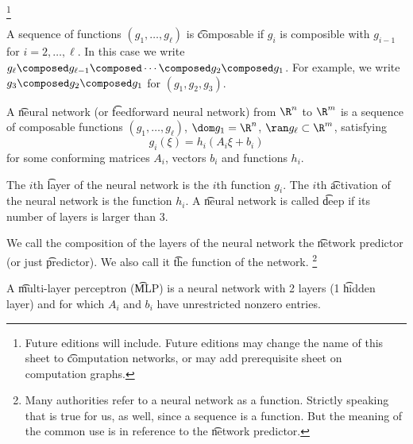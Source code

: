 
  \ifhmode\unskip\fi\footnote{
Future editions will include. Future editions may change the name of this sheet to \t{computation networks}, or may add prerequisite sheet on computation graphs.
  }


A sequence of functions $(g_1, \dots, g_\ell)$ is \t{composable} if $g_i$ is composible with $g_{i-1}$ for $i = 2, \dots, \ell$.
In this case we write $g_\ell \composed g_{\ell-1} \composed \cdots \composed g_2 \composed g_1$. For example, we write $g_3 \composed g_2 \composed g_1$ for $(g_1, g_2, g_3)$.

A \t{neural network} (or \t{feedforward neural network}) from $\R^n$ to $\R^m$ is a sequence of composable functions $(g_1, \dots, g_{\ell})$, $\dom g_1 = \R^n$, $\ran g_\ell \subset \R^m$, satisfying
  \[
g_i(\xi) = h_i(A_i \xi + b_i)
  \]
for some conforming matrices $A_i$, vectors $b_i$ and functions $h_i$.

The $i$th \t{layer} of the neural network is the $i$th function $g_i$.
The $i$th \t{activation} of the neural network is the function $h_i$.
A \t{neural network} is called \t{deep} if its number of layers is larger than 3.

We call the composition of the layers of the neural network the \t{network predictor} (or just \t{predictor}).
We also call it \t{the function} of the network.
  \ifhmode\unskip\fi\footnote{
Many authorities refer to a neural network as a function. Strictly speaking that is true for us, as well, since a sequence is a function. But the meaning of the common use is in reference to the \t{network predictor}.
  }

A \t{multi-layer perceptron} (\t{MLP}) is a neural network with 2 layers (1 \t{hidden layer}) and for which $A_i$ and $b_i$ have unrestricted nonzero entries.


%
%
%

\blankpage
